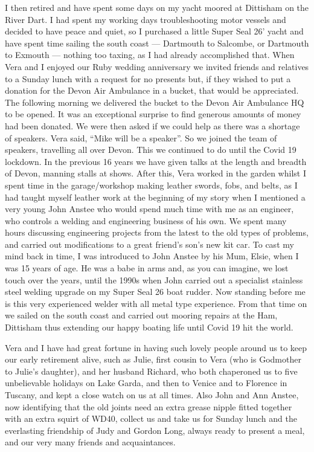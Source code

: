 I then retired and have spent some days on my yacht moored at Dittisham on the
River Dart. I had spent my working days troubleshooting motor vessels and
decided to have peace and quiet, so I purchased a little Super Seal 26' yacht
and have spent time sailing the south coast --- Dartmouth to Salcombe, or
Dartmouth to Exmouth --- nothing too taxing, as I had already accomplished
that. When Vera and I enjoyed our Ruby wedding anniversary we invited friends
and relatives to a Sunday lunch with a request for no presents but, if they
wished to put a donation for the Devon Air Ambulance in a bucket, that would be
appreciated. The following morning we delivered the bucket to the Devon Air
Ambulance HQ to be opened. It was an exceptional surprise to find generous
amounts of money had been donated. We were then asked if we could help as there
was a shortage of speakers. Vera said, ``Mike will be a speaker''. So we joined
the team of speakers, travelling all over Devon. This we continued to do until
the Covid 19 lockdown. In the previous 16 years we have given talks at the
length and breadth of Devon, manning stalls at shows. After this, Vera worked
in the garden whilst I spent time in the garage/workshop making leather swords,
fobs, and belts, as I had taught myself leather work at the beginning of my
story when I mentioned a very young John Anstee who would spend much time with
me as an engineer, who controls a welding and engineering business of his own.
We spent many hours discussing engineering projects from the latest to the old
types of problems, and carried out modifications to a great friend's son's new
kit car. To cast my mind back in time, I was introduced to John Anstee by his
Mum, Elsie, when I was 15 years of age. He was a babe in arms and, as you can
imagine, we lost touch over the years, until the 1990s when John carried out a
specialist stainless steel welding upgrade on my Super Seal 26 boat rudder. Now
standing before me is this very experienced welder with all metal type
experience. From that time on we sailed on the south coast and carried out
mooring repairs at the Ham, Dittisham thus extending our happy boating life
until Covid 19 hit the world.

Vera and I have had great fortune in having such lovely people around us to keep
our early retirement alive, such as Julie, first cousin to Vera (who is
Godmother to Julie's daughter), and her husband Richard, who both chaperoned us
to five unbelievable holidays on Lake Garda, and then to Venice and to Florence
in Tuscany, and kept a close watch on us at all times. Also John and Ann
Anstee, now identifying that the old joints need an extra grease nipple fitted
together with an extra squirt of WD40, collect us and take us for Sunday lunch
and the everlasting friendship of Judy and Gordon Long, always ready to present
a meal, and our very many friends and acquaintances. 

